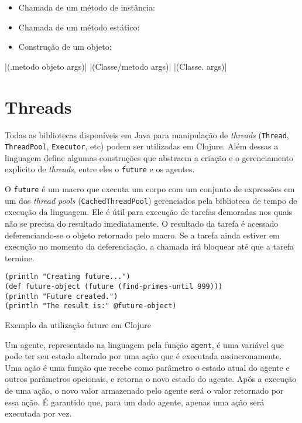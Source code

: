 \begin{listing}[!h]
 \begin{minipage}{0.48\textwidth}
  \centering
  \begin{itemize}
   \item Chamada de um método de instância:
   \item Chamada de um método estático:
   \item Construção de um objeto:
  \end{itemize}
 \end{minipage}
 \begin{minipage}{0.52\textwidth}
  |(.metodo objeto args)|
  |(Classe/metodo args)|
  |(Classe. args)|
 \end{minipage}
\end{listing}


\section{Threads}

Todas as bibliotecas disponíveis em Java para manipulação de \emph{threads} (\verb|Thread|, \verb|ThreadPool|, \verb|Executor|, etc) podem ser utilizadas em Clojure. Além dessas a linguagem define algumas construções que abstraem a criação e o gerenciamento explicito de \emph{threads}, entre eles o \verb|future| e os agentes.

O \verb|future| é um macro que executa um corpo com um conjunto de expressões em um dos \emph{thread pools} (\verb|CachedThreadPool|) gerenciados pela biblioteca de tempo de execução da linguagem. Ele é útil para execução de tarefas demoradas nos quais não se precisa do resultado imediatamente. O resultado da tarefa é acessado deferenciando-se o objeto retornado pelo macro. Se a tarefa ainda estiver em execução no momento da deferenciação, a chamada irá bloquear até que a tarefa termine.

\begin{listing}
  \begin{verbatim}
(println "Creating future...")
(def future-object (future (find-primes-until 999)))
(println "Future created.")
(println "The result is:" @future-object)
  \end{verbatim}
  \caption{Exemplo da utilização future em Clojure}
\end{listing}

Um agente, representado na linguagem pela função \verb|agent|, é uma variável que pode ter seu estado alterado por uma ação que é executada assincronamente. Uma ação é uma função que recebe como parâmetro o estado atual do agente e outros parâmetros opcionais, e retorna o novo estado do agente. Após a execução de uma ação, o novo valor armazenado pelo agente será o valor retornado por essa ação. É garantido que, para um dado agente, apenas uma ação será executada por vez.

